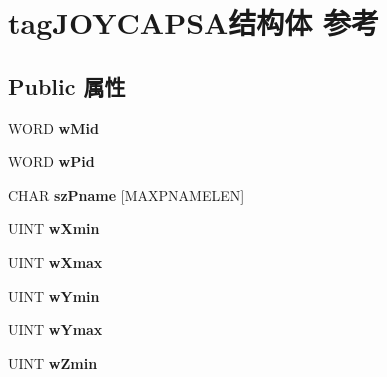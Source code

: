 \hypertarget{structtag_j_o_y_c_a_p_s_a}{}\section{tag\+J\+O\+Y\+C\+A\+P\+S\+A结构体 参考}
\label{structtag_j_o_y_c_a_p_s_a}
\subsection*{Public 属性}
\begin{DoxyCompactItemize}
\item 
\mbox{\label{structtag_j_o_y_c_a_p_s_a_a2b690997c2f62bf40da1e7cef05c265d}} 
W\+O\+RD {\bfseries w\+Mid}
\item 
\mbox{\label{structtag_j_o_y_c_a_p_s_a_aa6fff4b6995af8cb6b33b344f6a94ddf}} 
W\+O\+RD {\bfseries w\+Pid}
\item 
\mbox{\label{structtag_j_o_y_c_a_p_s_a_a1b2b48d9d9d8fd2af50f0a14b39bc4c0}} 
C\+H\+AR {\bfseries sz\+Pname} \mbox{[}M\+A\+X\+P\+N\+A\+M\+E\+L\+EN\mbox{]}
\item 
\mbox{\label{structtag_j_o_y_c_a_p_s_a_a45342e9cd18696bb22295bf824a797c0}} 
U\+I\+NT {\bfseries w\+Xmin}
\item 
\mbox{\label{structtag_j_o_y_c_a_p_s_a_aa9d2f52fc80f4980fd52f571d6251f4b}} 
U\+I\+NT {\bfseries w\+Xmax}
\item 
\mbox{\label{structtag_j_o_y_c_a_p_s_a_a653d08636d229d68a15316b2a90d1da5}} 
U\+I\+NT {\bfseries w\+Ymin}
\item 
\mbox{\label{structtag_j_o_y_c_a_p_s_a_a77f91bdeaa5458c35faa0ee86448f260}} 
U\+I\+NT {\bfseries w\+Ymax}
\item 
\mbox{\label{structtag_j_o_y_c_a_p_s_a_aea295935ff018585b17bf62e1e31bad0}} 
U\+I\+NT {\bfseries w\+Zmin}
\item 
\mbox{\label{structtag_j_o_y_c_a_p_s_a_a360ad174d6516ab65d5c6aa35e0779c6}} 

\end{DoxyCompactItemize}
